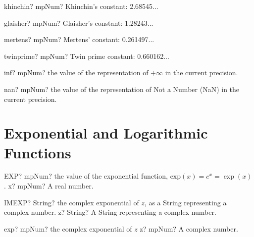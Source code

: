 \documentclass[12pt,a4paper,openany]{book}
\begin{document}
\begin{mpFunctionsExtract}
\mpFunctionZero
{khinchin? mpNum?  Khinchin's constant: 2.68545...}
\end{mpFunctionsExtract}

\begin{mpFunctionsExtract}
\mpFunctionZero
{glaisher? mpNum?  Glaisher's constant: 1.28243...}
\end{mpFunctionsExtract}

\begin{mpFunctionsExtract}
\mpFunctionZero
{mertens? mpNum?  Mertens' constant: 0.261497...}
\end{mpFunctionsExtract}

\begin{mpFunctionsExtract}
\mpFunctionZero
{twinprime? mpNum?  Twin prime constant: 0.660162...}
\end{mpFunctionsExtract}

\begin{mpFunctionsExtract}
\mpFunctionZero
{inf? mpNum? the value of the representation of  $+\infty$ in the current precision.}
\end{mpFunctionsExtract}

\begin{mpFunctionsExtract}
\mpFunctionZero
{nan? mpNum? the value of the representation of Not a Number (NaN) in the current precision.}
\end{mpFunctionsExtract}

\section{Exponential and Logarithmic Functions}

\begin{mpFunctionsExtract}
\mpWorksheetFunctionOneNotImplemented
{EXP? mpNum? the value of the exponential function, $\text{exp}(x) = e^x = \exp(x)$.}
{x? mpNum? A real number.}
\end{mpFunctionsExtract}

\begin{mpFunctionsExtract}
\mpWorksheetFunctionOneNotImplemented
{IMEXP? String? the complex exponential of $z$, as a String representing a complex number.}
{z? String? A String representing a complex number.}
\end{mpFunctionsExtract}

\begin{mpFunctionsExtract}
\mpFunctionOne
{exp? mpNum? the complex exponential of $z$}
{z? mpNum? A complex number.}
\end{mpFunctionsExtract}
\end{document}
